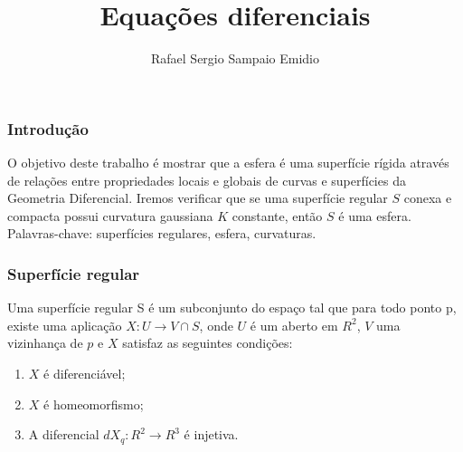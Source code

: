 \documentclass[blue]{beamer}
\title[UFPA]{Equações diferenciais}
\author{Rafael Sergio Sampaio Emidio}
\institute
	{
		XXX Seminário de Iniciação Científica 2019 \\
		Bolsa PIBIC/PRODOUTOR \\
Instituto de Ciências Exatas e Naturais\\
Orientador: Augusto César dos Reis Costa}
\begin{document}
\frame{\titlepage}



\begin{frame}
 \frametitle{Introdução}

\justify
 \hspace{0.2cm}O objetivo deste trabalho é mostrar que a esfera é uma superfície rígida através de relações entre propriedades locais e globais de curvas e superfícies da Geometria Diferencial. Iremos verificar que se uma superfície regular $S$ conexa e compacta possui curvatura gaussiana $K$ constante, então $S$ é uma esfera.\\
 \vspace{2cm}
 Palavras-chave: superfícies regulares, esfera, curvaturas.


\end{frame}
%
%
%
%
%
%
%
%
\begin{frame}
\frametitle{Superfície regular} 
\justify
\hspace{0.2cm}Uma superfície regular S é um subconjunto do espaço tal que para todo ponto p, existe uma aplicação $X: U \rightarrow V\cap S$, onde $U$ é um aberto em $R^2$, $V$ uma vizinhança de $p$ e $X$ satisfaz as seguintes condições:
\begin{enumerate}
	\item $X$ é diferenciável;
	\item $X$ é homeomorfismo;
	\item A diferencial $dX_q: R^2 \rightarrow R^3$ é injetiva.
\end{enumerate}
\end{frame}
\end{document}
